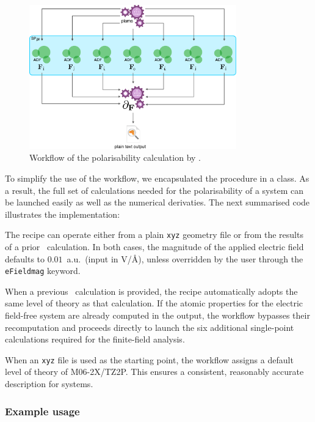 \begin{figure}[h]
  \centering
  \includegraphics[width=0.8\textwidth]{diagramas/pola_diagram.pdf}
  \caption{Workflow of the polarisability calculation by \plams.}
  \label{polarisability_workflow}
\end{figure}

\newpage
To simplify the use of the \plams workflow, we encapsulated the procedure in a
\python class. As a result, the full set of calculations needed for the
polarisability of a system can be launched easily as well as the numerical
derivaties. The next summarised \python code illustrates the implementation:



\newpage

The \plams recipe can operate either from a plain \texttt{xyz} geometry
file or from the results of a prior \adf\ calculation. In both cases, the
magnitude of the applied electric field defaults to $0.01$~a.u.\ (input in
V/\AA), unless overridden by the user through the \texttt{eFieldmag}
keyword.

When a previous \adf\ calculation is provided, the recipe automatically
adopts the same level of theory as that calculation. If the atomic
properties for the electric field-free system are already computed in the \adf output,
the workflow bypasses their recomputation and proceeds directly to launch
the six additional single-point calculations required for the finite-field
analysis.

When an \texttt{xyz} file is used as the starting point, the workflow
assigns a default level of theory of M06-2X/TZ2P. This ensures a consistent,
reasonably accurate description for systems.

\subsubsection{Example usage}

